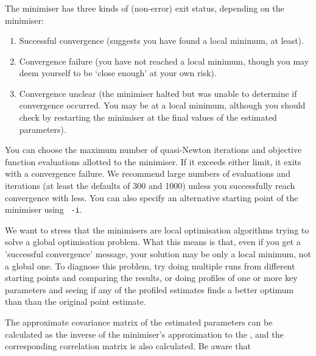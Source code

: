 \subsubsection{}

The minimiser has three kinds of (non-error) exit status, depending on the minimiser: 

\begin{enumerate}
\item Successful convergence (suggests you have found a local minimum, at least).
\item Convergence failure (you have not reached a local minimum, though you may deem yourself to be `close enough' at your own risk).
\item Convergence unclear (the minimiser halted but was unable to determine if convergence occurred. You may be at a local minimum, although you should check by restarting the minimiser at the final values of the estimated parameters).
\end{enumerate}

You can choose the maximum number of quasi-Newton iterations and objective function evaluations allotted to the minimiser. If it exceeds either limit, it exits with a convergence failure. We recommend large numbers of evaluations and iterations (at least the defaults of 300 and 1000) unless you successfully reach convergence with less. You can also specify an alternative starting point of the minimiser using \texttt{\cname\ -i}.

We want to stress that the minimisers are local optimisation algorithms trying to solve a global optimisation problem. What this means is that, even if you get a 'successful convergence' message, your solution may be only a local minimum, not a global one. To diagnose this problem, try doing multiple runs from different starting points and comparing the results, or doing profiles of one or more key parameters and seeing if any of the profiled estimates finds a better optimum than than the original point estimate.

The approximate covariance matrix of the estimated parameters can be calculated as the inverse of the minimiser's approximation to the , and the corresponding correlation matrix is also calculated. Be aware that

